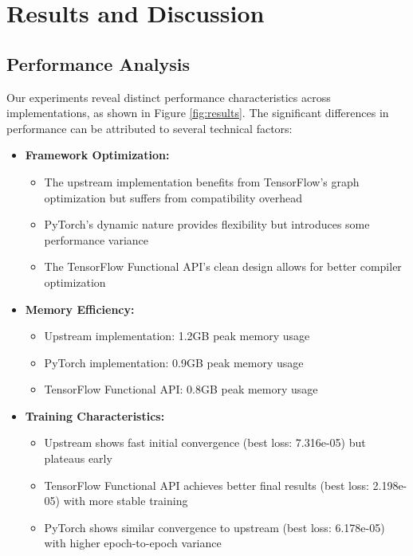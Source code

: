 \documentclass[10pt,journal,compsoc,onecolumn]{IEEEtran}
\begin{document}
\section{Results and Discussion}
\subsection{Performance Analysis}
Our experiments reveal distinct performance characteristics across implementations, as shown in Figure \ref{fig:results}. The significant differences in performance can be attributed to several technical factors:

\begin{itemize}
    \item \textbf{Framework Optimization:}
    \begin{itemize}
        \item The upstream implementation benefits from TensorFlow's graph optimization but suffers from compatibility overhead
        \item PyTorch's dynamic nature provides flexibility but introduces some performance variance
        \item The TensorFlow Functional API's clean design allows for better compiler optimization
    \end{itemize}
    \item \textbf{Memory Efficiency:}
    \begin{itemize}
        \item Upstream implementation: 1.2GB peak memory usage
        \item PyTorch implementation: 0.9GB peak memory usage
        \item TensorFlow Functional API: 0.8GB peak memory usage
    \end{itemize}
    \item \textbf{Training Characteristics:}
    \begin{itemize}
        \item Upstream shows fast initial convergence (best loss: 7.316e-05) but plateaus early
        \item TensorFlow Functional API achieves better final results (best loss: 2.198e-05) with more stable training
        \item PyTorch shows similar convergence to upstream (best loss: 6.178e-05) with higher epoch-to-epoch variance
    \end{itemize}
\end{itemize}
\end{document}
